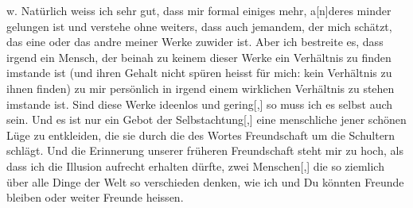                w. Natürlich weiss ich sehr gut, dass mir formal einiges mehr,
                  a{[}n{]}deres minder gelungen ist und verstehe ohne weiters, dass
               auch jemand\introOben{}em\introOben{}, der mich schätzt, das eine oder das andre
               meiner Werke zuwider ist. Aber ich bestreite es, dass irgend ein Mensch, der beinah
               zu keinem dieser Werke ein Verhältnis zu finden imstande ist (und ihren Gehalt nicht
               spüren heisst für mich\introOben{}:\introOben{} kein Verhältnis zu ihnen finden) zu
               mir persönlich in irgend einem wirklichen Verhältnis zu stehen imstande {\pb}ist. Sind diese Werke ideenlos und
                  gering{[},{]} so muss ich es selbst auch sein. Und es ist nur ein
               Gebot der Selbstachtung{[},{]} eine menschliche \label{T_L03520-3v}\label{T_L03520-3h} jener
               schönen Lüge zu entkleiden, die sie durch die \label{T_L03520-8v}\label{T_L03520-8h} des  Wortes Freundschaft um die Schultern schlägt. Und die Erinnerung
               unserer früheren Freundschaft steht mir zu hoch, als dass ich die Illusion aufrecht
               erhalten dürfte, zwei Menschen{[},{]} die so ziemlich über alle Dinge
               der Welt so verschieden denken, wie ich und Du könnten Freunde bleiben oder weiter
               Freunde heissen.\pend
           \endnumbering{}  
      